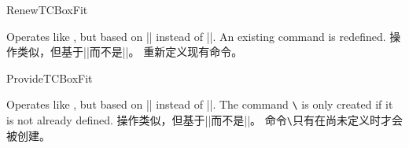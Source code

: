\begin{docCommand}{RenewTCBoxFit}{}
\begin{stripedbox}
Operates like , but based on |\RenewDocumentCommand| instead of |\DeclareDocumentCommand|.
An existing command is redefined.
\tcblower
操作类似，但基于|\RenewDocumentCommand|而不是|\DeclareDocumentCommand|。
重新定义现有命令。
\end{stripedbox}
\end{docCommand}

\begin{docCommand}{ProvideTCBoxFit}{}
\begin{stripedbox}
Operates like , but based on |\ProvideDocumentCommand| instead of |\DeclareDocumentCommand|.
The command \texttt{\textbackslash} is only created if it is not already defined.
\tcblower
操作类似，但基于|\ProvideDocumentCommand|而不是|\DeclareDocumentCommand|。
命令\texttt{\textbackslash}只有在尚未定义时才会被创建。
\end{stripedbox}
\end{docCommand}


